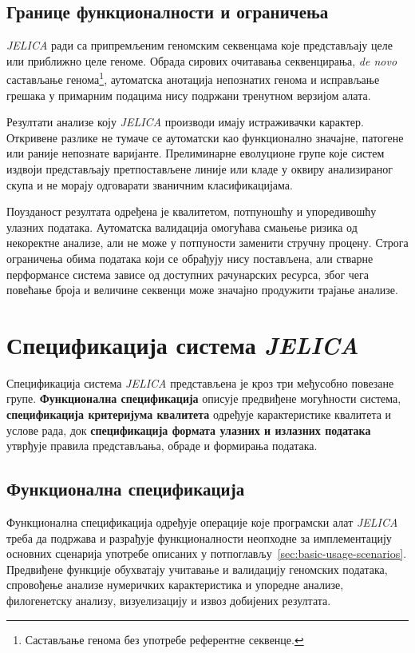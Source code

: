 \documentclass[12pt,oneside]{memoir}
\begin{document}
\subsection{Границе функционалности и ограничења}
\textit{JELICA} ради са припремљеним геномским секвенцама које представљају целе или приближно целе геноме. Обрада сирових очитавања секвенцирања, \textit{de novo} састављање генома\footnote{Састављање генома без употребе референтне секвенце.}, аутоматска анотација непознатих генома и исправљање грешака у примарним подацима нису подржани тренутном верзијом алата.

Резултати анализе коју \textit{JELICA} производи имају истраживачки карактер. Откривене разлике не тумаче се аутоматски као функционално значајне, патогене или раније непознате варијанте. Прелиминарне еволуционе групе које систем издвоји представљају претпостављене линије или кладе у оквиру анализираног скупа и не морају одговарати званичним класификацијама.

Поузданост резултата одређена је квалитетом, потпуношћу и упоредивошћу улазних података. Аутоматска валидација омогућава смањење ризика од некоректне анализе, али не може у потпуности заменити стручну процену. Строга ограничења обима података који се обрађују нису постављена, али стварне перформансе система зависе од доступних рачунарских ресурса, због чега повећање броја и величине секвенци може значајно продужити трајање анализе.


\section{Спецификација система \textit{JELICA}}
Спецификација система \textit{JELICA} представљена је кроз три међусобно повезане групе. \textbf{Функционална спецификација} описује предвиђене могућности система, \textbf{спецификација критеријума квалитета} одређује карактеристике квалитета и услове рада, док \textbf{спецификација формата улазних и излазних података} утврђује правила представљања, обраде и формирања података.


\subsection{Функционална спецификација}
\label{sec:functional-specification}
Функционална спецификација одређује операције које програмски алат \textit{JELICA} треба да подржава и разрађује функционалности неопходне за имплементацију основних сценарија употребе описаних у потпоглављу~\ref{sec:basic-usage-scenarios}. Предвиђене функције обухватају учитавање и валидацију геномских података, спровођење анализе нумеричких карактеристика и упоредне анализе, филогенетску анализу, визуелизацију и извоз добијених резултата.
\end{document}
